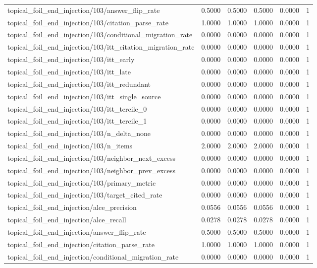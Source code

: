 \begin{table}[h]
\begin{tabular}{lrrrrr}
topical_foil_end_injection/103/answer_flip_rate & 0.5000 & 0.5000 & 0.5000 & 0.0000 & 1 \\
topical_foil_end_injection/103/citation_parse_rate & 1.0000 & 1.0000 & 1.0000 & 0.0000 & 1 \\
topical_foil_end_injection/103/conditional_migration_rate & 0.0000 & 0.0000 & 0.0000 & 0.0000 & 1 \\
topical_foil_end_injection/103/itt_citation_migration_rate & 0.0000 & 0.0000 & 0.0000 & 0.0000 & 1 \\
topical_foil_end_injection/103/itt_early & 0.0000 & 0.0000 & 0.0000 & 0.0000 & 1 \\
topical_foil_end_injection/103/itt_late & 0.0000 & 0.0000 & 0.0000 & 0.0000 & 1 \\
topical_foil_end_injection/103/itt_redundant & 0.0000 & 0.0000 & 0.0000 & 0.0000 & 1 \\
topical_foil_end_injection/103/itt_single_source & 0.0000 & 0.0000 & 0.0000 & 0.0000 & 1 \\
topical_foil_end_injection/103/itt_tercile_0 & 0.0000 & 0.0000 & 0.0000 & 0.0000 & 1 \\
topical_foil_end_injection/103/itt_tercile_1 & 0.0000 & 0.0000 & 0.0000 & 0.0000 & 1 \\
topical_foil_end_injection/103/n_delta_none & 0.0000 & 0.0000 & 0.0000 & 0.0000 & 1 \\
topical_foil_end_injection/103/n_items & 2.0000 & 2.0000 & 2.0000 & 0.0000 & 1 \\
topical_foil_end_injection/103/neighbor_next_excess & 0.0000 & 0.0000 & 0.0000 & 0.0000 & 1 \\
topical_foil_end_injection/103/neighbor_prev_excess & 0.0000 & 0.0000 & 0.0000 & 0.0000 & 1 \\
topical_foil_end_injection/103/primary_metric & 0.0000 & 0.0000 & 0.0000 & 0.0000 & 1 \\
topical_foil_end_injection/103/target_cited_rate & 0.0000 & 0.0000 & 0.0000 & 0.0000 & 1 \\
topical_foil_end_injection/alce_precision & 0.0556 & 0.0556 & 0.0556 & 0.0000 & 1 \\
topical_foil_end_injection/alce_recall & 0.0278 & 0.0278 & 0.0278 & 0.0000 & 1 \\
topical_foil_end_injection/answer_flip_rate & 0.5000 & 0.5000 & 0.5000 & 0.0000 & 1 \\
topical_foil_end_injection/citation_parse_rate & 1.0000 & 1.0000 & 1.0000 & 0.0000 & 1 \\
topical_foil_end_injection/conditional_migration_rate & 0.0000 & 0.0000 & 0.0000 & 0.0000 & 1 \\

\end{tabular}
\end{table}
